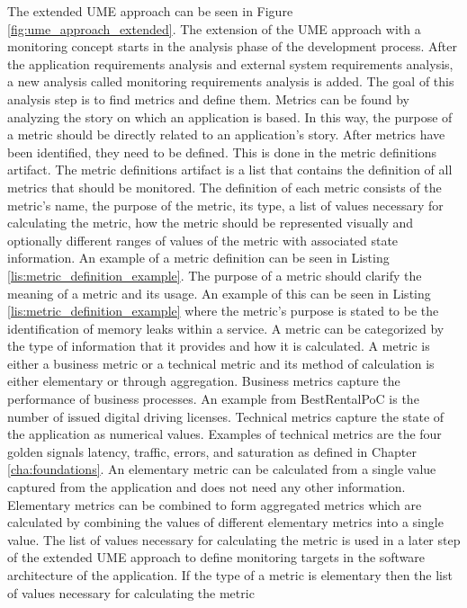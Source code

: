 The extended UME approach can be seen in Figure \ref{fig:ume_approach_extended}.
The extension of the UME approach with a monitoring concept starts in the analysis phase
of the development process. After the application requirements analysis and external system requirements analysis,
a new analysis called monitoring requirements analysis is added.
The goal of this analysis step is to find metrics and define them.
Metrics can be found by analyzing the story on which an application is based.
In this way, the purpose of a metric should be directly related to an application's story.
After metrics have been identified, they need to be defined. This is done in the metric definitions artifact.
The metric definitions artifact is a list
that contains the definition of all metrics that should be monitored.
The definition of each metric consists of the metric's name, the purpose of the metric,
its type, a list of values necessary for calculating the metric, how the metric should
be represented visually and optionally different ranges of values of the metric with associated
state information. An example of a metric definition can be seen in Listing \ref{lis:metric_definition_example}.
The purpose of a metric should clarify the meaning of a metric and its usage.
An example of this can be seen in Listing \ref{lis:metric_definition_example} where the metric's
purpose is stated to be the identification of memory leaks within a service.
A metric can be categorized by the type of information that it provides and how it is calculated.
A metric is either a business metric or a technical metric and its method of calculation is either
elementary or through aggregation.
Business metrics capture the performance of business processes.
An example from BestRentalPoC is the number of issued digital driving licenses.
Technical metrics capture the state of the application as numerical values.
Examples of technical metrics are the four golden signals latency, traffic, errors, and saturation
as defined in Chapter \ref{cha:foundations}.
An elementary metric can be calculated from a single value captured from the application and does not
need any other information. Elementary metrics can be combined to form aggregated metrics
which are calculated by combining the values of different elementary metrics into a single value.
The list of values necessary for calculating the metric is used in a later step
of the extended UME approach to define monitoring targets in the software architecture of the application.
If the type of a metric is elementary then the list of values necessary for calculating the metric
